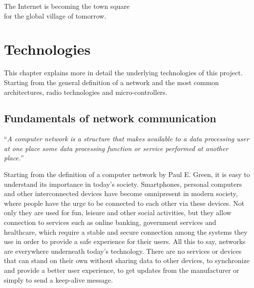 
\begin{savequote}[65mm]
	The Internet is becoming the town square\\for the global village of tomorrow.
\end{savequote}


\chapter{Technologies}\label{chapter:technologies}
	
	This chapter explains more in detail the underlying technologies of this project.
	Starting from the general definition of a network and the most common architectures, radio technologies and micro-controllers.
		
	\section{Fundamentals of network communication}
		
		\begin{center}
			\begin{minipage}[H]{0.9\columnwidth}
				\begin{center}
					``\textit{A computer network is a structure that makes available to a data processing user at one place some data processing function or service performed at another place.}'' \cite{nla.cat-vn252493}
				\end{center}
			\end{minipage}
		\end{center}
	
		Starting from the definition of a computer network by Paul E. Green, it is easy to understand its importance in today's society.
		Smartphones, personal computers and other interconnected devices have become omnipresent in modern society, where people have the urge to be connected to each other via these devices.
		Not only they are used for fun, leisure and other social activities, but they allow connection to services such as online banking, government services and healthcare, which require a stable and secure connection among the systems they use in order to provide a safe experience for their users.
		All this to say, networks are everywhere underneath today's technology.
		There are no services or devices that can stand on their own without sharing data to other devices, to synchronize and provide a better user experience, to get updates from the manufacturer or simply to send a keep-alive message.
		
